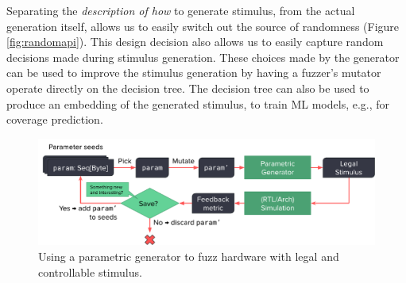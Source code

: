 \documentclass[sigplan,review,nonacm,9pt]{acmart}
\begin{document}
Separating the \textit{description of how} to generate stimulus, from the actual generation itself, allows us to easily switch out the source of randomness (Figure \ref{fig:randomapi}).
This design decision also allows us to easily capture random decisions made during stimulus generation.
These choices made by the generator can be used to improve the stimulus generation by having a fuzzer's mutator operate directly on the decision tree.
The decision tree can also be used to produce an embedding of the generated stimulus, to train ML models, e.g., for coverage prediction.

\begin{figure}[b]
\includegraphics[width=\linewidth]{fuzzing/parametric_fuzzing_hw.pdf}
\caption{Using a parametric generator to fuzz hardware with legal and controllable stimulus.}
\label{fig:parametric_fuzzing}
\end{figure}

%
%
\end{document}
